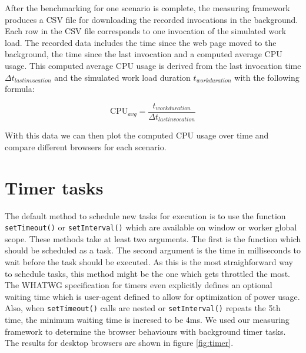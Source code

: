\documentclass[
	ruledheaders=section,%
	class=report,%
	thesis={type=bachelor},%
	accentcolor=9c,%
	custommargins=true,%
	marginpar=false,%
	parskip=half-,%
	fontsize=11pt,%
]{tudapub}
\begin{document}
  After the benchmarking for one scenario is complete, the measuring framework produces a CSV file for downloading the recorded invocations in the background. Each row in the CSV file corresponds to one invocation of the simulated work load. The recorded data includes the time since the web page moved to the background, the time since the last invocation and a computed average CPU usage. This computed average CPU usage is derived from the last invocation time $\Delta t_{last invocation}$ and the simulated work load duration $t_{work duration}$  with the following formula:

  \begin{equation*}
    \text{CPU}_{avg} = \frac{t_{work duration}}{\Delta t_{last invocation}}
  \end{equation*}

  With this data we can then plot the computed CPU usage over time and compare different browsers for each scenario.

  
  \section{Timer tasks}
  \label{sec:timer-tasks}

  The default method to schedule new tasks for execution is to use the function \texttt{setTimeout()} or \texttt{setInterval()} which are available on window or worker global scope. These methods take at least two arguments. The first is the function which should be scheduled as a task. The second argument is the time in milliseconds to wait before the task should be executed. As this is the most straighforward way to schedule tasks, this method might be the one which gets throttled the most. The WHATWG specification for timers \cite{whatwg-timers} even explicitly defines an optional waiting time which is user-agent defined to allow for optimization of power usage. Also, when \texttt{setTimeout()} calls are nested or \texttt{setInterval()} repeats the 5th time, the minimum waiting time is incresed to be 4ms. We used our measuring framework to determine the browser behaviours with background timer tasks. The results for desktop browsers are shown in figure \ref{fig:timer}.
\end{document}
